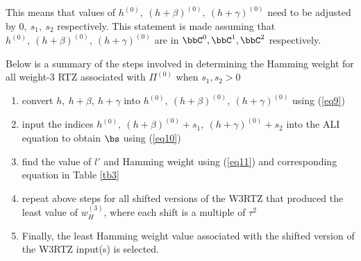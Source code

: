  This means that values of $h^{(0)},~(h+\beta)^{(0)},~(h+\gamma)^{(0)}$ need to be adjusted by $0,~s_1,~s_2$ respectively. This statement is made assuming that $h^{(0)},~(h+\beta)^{(0)},~(h+\gamma)^{(0)}$ are in $\bbC^0,\bbC^1,\bbC^2$ respectively.
 
  Below is a summary of the steps involved in determining the Hamming weight for all weight-$3$ RTZ associated with $\Pi^{(0)}$ when $s_1,s_2>0$
 \begin{enumerate}
 \item convert  $h,~h+\beta,~h+\gamma$ into $h^{(0)},~(h+\beta)^{(0)},~(h+\gamma)^{(0)}$ using (\ref{eq9})
 
 \item input the indices $h^{(0)},~(h+\beta)^{(0)}+s_1,~(h+\gamma)^{(0)}+s_2$
 into the ALI equation to obtain $\bs$ using (\ref{eq10})
 
 \item find the value of $l'$ and  Hamming weight using (\ref{eq11}) and corresponding equation in Table \ref{tb3}
 
 \item repeat above steps for all shifted versions of the W3RTZ that produced the least value of $w_H^{(3)}$, where each shift is a multiple of $\tau^2$
 
\item Finally, the least Hamming weight value associated with the shifted version of the W3RTZ input(s) is selected.
 \end{enumerate}
 
